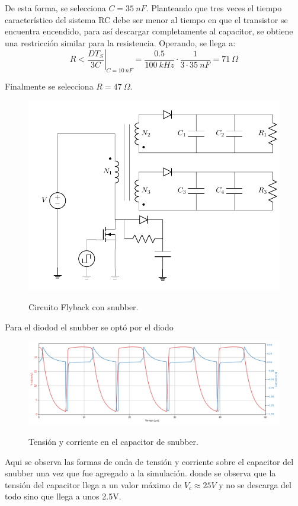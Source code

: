 De esta forma, se selecciona $C = 35 \ nF$. Planteando que tres veces el tiempo característico del sistema RC debe ser menor al tiempo en que el transistor se encuentra encendido, para así descargar completamente al capacitor, se obtiene una restricción similar para la resistencia. Operando, se llega a:
\begin{equation}
	R < \left. \frac{DT_S}{3C} \right|_{C = 10 \ nF} = \frac{0.5}{100 \ kHz} \cdot \frac{1}{3 \cdot 35 \ nF} = 71 \ \Omega
\end{equation}

Finalmente se selecciona $R = 47 \ \Omega$.

\begin{figure}[H]
	\centering
	\includegraphics[width=0.4\linewidth, page = 1]{ImagenesParteII/FlybackSnubber.pdf}
	\label{fig:fly_snubber}
	\caption{Circuito Flyback con snubber.}
\end{figure}
Para el diodod el snubber se optó por el diodo 
\begin{figure}[H]
	\centering
	\includegraphics[width=0.9\linewidth]{ImagenesParteII/Cap_snub.png}
	\label{fig:tensionesvarias}
	\caption{Tensión y corriente en el capacitor de snubber.}
\end{figure}
Aqui se observa las formas de onda de tensión y corriente sobre el capacitor del snubber una vez que fue agregado a la simulación. donde se observa que la tensión del capacitor llega a un valor máximo de $V_c \approx 25V$ y no se descarga del todo sino que llega a unos 2.5V.
